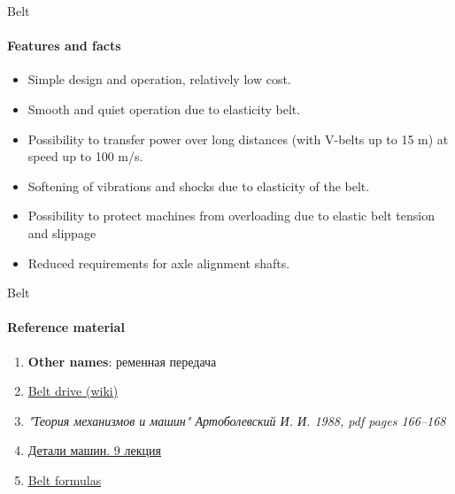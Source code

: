 \documentclass[aspectratio=169]{beamer}
\begin{document}
\begin{frame}[t]{Belt}
    \framesubtitle{Features and facts}
    \begin{itemize}
        \item Simple design and operation, relatively low cost. 
        \item Smooth and quiet operation due to elasticity belt. 
        \item Possibility to transfer power over long distances (with V-belts up to 15 m) at speed up to 100 m/s. 
        \item Softening of vibrations and shocks due to elasticity of the belt. 
        \item Possibility to protect machines from overloading due to elastic belt tension and slippage  
        \item Reduced requirements for axle alignment 
        shafts.
    \end{itemize}
\end{frame}

\begin{frame}[t]{Belt}
    \framesubtitle{Reference material}
    \begin{enumerate}
        \item \textbf{Other names}: ременная передача
        \item \href{https://en.m.wikipedia.org/wiki/Belt_(mechanical)}{Belt drive (wiki)}
        \item \textit{"Теория механизмов и машин" Артоболевский И. И. 1988, pdf pages 166--168 }
        \item \href{https://studfile.net/preview/2156455/}{Детали машин. 9 лекция}
        \item \href{https://youtu.be/CP_b7bzM9nQ}{Belt formulas}
    \end{enumerate}
\end{frame}
\end{document}
